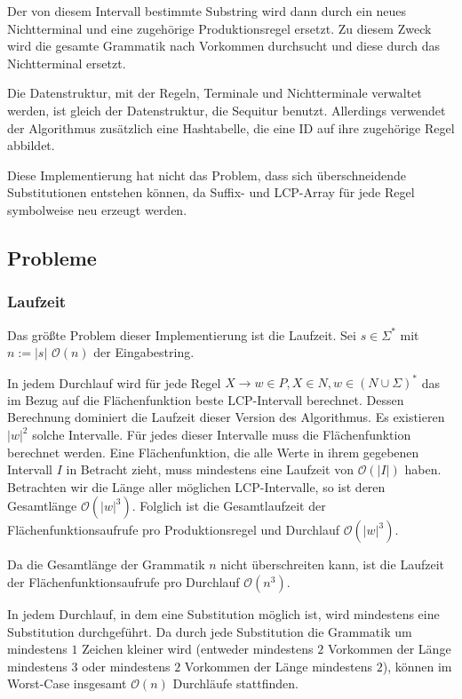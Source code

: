 Der von diesem Intervall bestimmte Substring wird dann durch ein neues Nichtterminal und eine zugehörige Produktionsregel ersetzt. Zu diesem Zweck wird die gesamte Grammatik nach Vorkommen durchsucht und diese durch das Nichtterminal ersetzt.

Die Datenstruktur, mit der Regeln, Terminale und Nichtterminale verwaltet werden, ist gleich der Datenstruktur, die Sequitur benutzt. Allerdings verwendet der Algorithmus zusätzlich eine Hashtabelle, die eine ID auf ihre zugehörige Regel abbildet.

Diese Implementierung hat nicht das Problem, dass sich überschneidende Substitutionen entstehen können, da Suffix- und LCP-Array für jede Regel symbolweise neu erzeugt werden. 

\subsection{Probleme}

\subsubsection{Laufzeit}
Das größte Problem dieser Implementierung ist die Laufzeit. Sei $s \in \Sigma^*$ mit $n := |s|$ $\mathcal{O}(n)$ der Eingabestring.

In jedem Durchlauf wird für jede Regel $X \rightarrow w \in P, X \in N, w \in (N \cup \Sigma)^*$ das im Bezug auf die Flächenfunktion beste LCP-Intervall berechnet. Dessen Berechnung dominiert die Laufzeit dieser Version des Algorithmus. 
Es existieren $|w|^2$ solche Intervalle.
Für jedes dieser Intervalle muss die Flächenfunktion berechnet werden. Eine Flächenfunktion, die alle Werte in ihrem gegebenen Intervall $I$ in Betracht zieht, muss mindestens eine Laufzeit von $\mathcal{O}(|I|)$ haben. Betrachten wir die Länge aller möglichen LCP-Intervalle, so ist deren Gesamtlänge $\mathcal{O}(|w|^3)$. Folglich ist die Gesamtlaufzeit der Flächenfunktionsaufrufe pro Produktionsregel und Durchlauf $\mathcal{O}(|w|^3)$. 

Da die Gesamtlänge der Grammatik $n$ nicht überschreiten kann, ist die Laufzeit der Flächenfunktionsaufrufe pro Durchlauf $\mathcal{O}(n^3)$. 

In jedem Durchlauf, in dem eine Substitution möglich ist, wird mindestens eine Substitution durchgeführt. Da durch jede Substitution die Grammatik um mindestens $1$ Zeichen kleiner wird (entweder mindestens $2$ Vorkommen der Länge mindestens $3$ oder mindestens $2$ Vorkommen der Länge mindestens $2$), können im Worst-Case insgesamt $\mathcal{O}(n)$ Durchläufe stattfinden.

